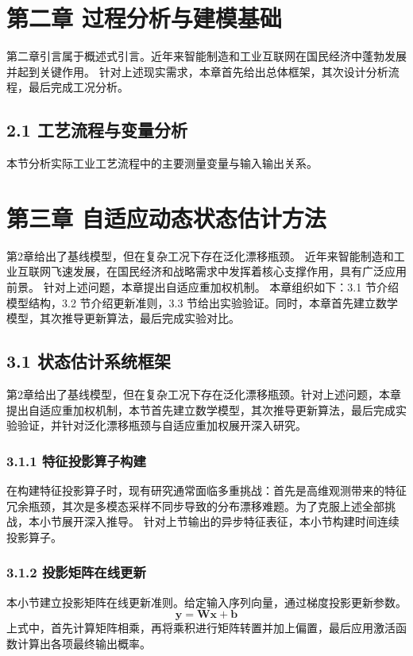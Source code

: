 \documentclass{ctexbook}
\begin{document}
\chapter{第二章 过程分析与建模基础}
第二章引言属于概述式引言。近年来智能制造和工业互联网在国民经济中蓬勃发展并起到关键作用。
针对上述现实需求，本章首先给出总体框架，其次设计分析流程，最后完成工况分析。

\section{2.1 工艺流程与变量分析}
本节分析实际工业工艺流程中的主要测量变量与输入输出关系。

\chapter{第三章 自适应动态状态估计方法}
第2章给出了基线模型，但在复杂工况下存在泛化漂移瓶颈。
近年来智能制造和工业互联网飞速发展，在国民经济和战略需求中发挥着核心支撑作用，具有广泛应用前景。
针对上述问题，本章提出自适应重加权机制。
本章组织如下：3.1 节介绍模型结构，3.2 节介绍更新准则，3.3 节给出实验验证。同时，本章首先建立数学模型，其次推导更新算法，最后完成实验对比。

\section{3.1 状态估计系统框架}
第2章给出了基线模型，但在复杂工况下存在泛化漂移瓶颈。针对上述问题，本章提出自适应重加权机制，本节首先建立数学模型，其次推导更新算法，最后完成实验验证，并针对泛化漂移瓶颈与自适应重加权展开深入研究。

\subsection{3.1.1 特征投影算子构建}
在构建特征投影算子时，现有研究通常面临多重挑战：首先是高维观测带来的特征冗余瓶颈，其次是多模态采样不同步导致的分布漂移难题。为了克服上述全部挑战，本小节展开深入推导。
针对上节输出的异步特征表征，本小节构建时间连续投影算子。

\subsection{3.1.2 投影矩阵在线更新}
本小节建立投影矩阵在线更新准则。给定输入序列向量，通过梯度投影更新参数。
\begin{equation}
\mathbf{y} = \mathbf{W} \mathbf{x} + \mathbf{b}
\end{equation}
上式中，首先计算矩阵相乘，再将乘积进行矩阵转置并加上偏置，最后应用激活函数计算出各项最终输出概率。
\end{document}
